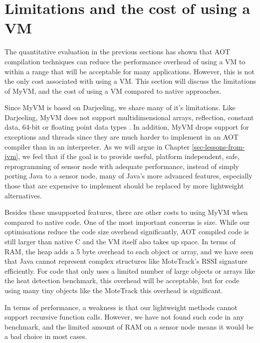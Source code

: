 \section{Limitations and the cost of using a VM}
\label{sec-evaluation-limitations}
The quantitative evaluation in the previous sections has shown that AOT compilation techniques can reduce the performance overhead of using a VM to within a range that will be acceptable for many applications. However, this is not the only cost associated with using a VM. This section will discuss the limitations of MyVM, and the cost of using a VM compared to native approaches.

Since MyVM is based on Darjeeling, we share many of it's limitations. Like Darjeeling, MyVM does not support multidimensional arrays, reflection, constant data, 64-bit or floating point data types \cite{Brouwers:2009cj}. In addition, MyVM drops support for exceptions and threads since they are much harder to implement in an AOT compiler than in an interpreter. As we will argue in Chapter \ref{sec-lessons-from-jvm}, we feel that if the goal is to provide useful, platform independent, safe, reprogramming of sensor node with adequate performance, instead of simply porting Java to a sensor node, many of Java's more advanced features, especially those that are expensive to implement should be replaced by more lightweight alternatives.

Besides these unsupported features, there are other costs to using MyVM when compared to native code. One of the most important concerns is size. While our optimisations reduce the code size overhead significantly, AOT compiled code is still larger than native C and the VM itself also takes up space. In terms of RAM, the heap adds a 5 byte overhead to each object or array, and we have seen that Java cannot represent complex structures like MoteTrack's RSSI signature efficiently. For code that only uses a limited number of large objects or arrays like the heat detection benchmark, this overhead will be acceptable, but for code using many tiny objects like the MoteTrack this overhead is significant.

In terms of performance, a weakness is that our lightweight methods cannot support recursive function calls. However, we have not found such code in any benchmark, and the limited amount of RAM on a sensor node means it would be a bad choice in most cases.

